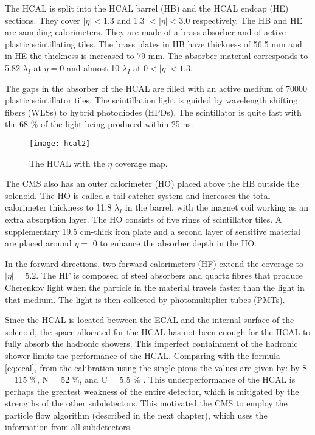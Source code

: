 \begin{normalsize}
The HCAL is split into the HCAL barrel (HB) and the HCAL endcap (HE) sections. They cover $ |\eta| < $1.3 and 1.3 $< |\eta| < $3.0 respectively. The HB and HE are sampling calorimeters. They are made of a brass absorber and of active plastic scintillating tiles. The brass plates in HB have thickness of 56.5 mm and in HE the thickness is increased to 79 mm. The absorber material corresponds to 5.82 $\lambda_I$ at $\eta = 0$ and almost 10 $\lambda_I$ at $0 < |\eta| < 1.3$.

The gaps in the absorber of the HCAL are filled with an active medium of 70000 plastic scintillator tiles. The scintillation light is guided by wavelength shifting fibers (WLSs) to hybrid photodiodes (HPDs). The scintillator is quite fast with the 68 $\%$ of the light being produced within 25 ns.

\begin{figure}[H]
  \centering
  \texttt{[image: hcal2]}
  \caption[The HCAL]{The HCAL with the $\eta$ coverage map.}
  \label{hcal2}
\end{figure}


The CMS also has an outer calorimeter (HO) placed above the HB outside the solenoid. The HO is called a tail catcher system and increases the total calorimeter thickness to 11.8 $\lambda_I$ in the barrel, with the magnet coil working as an extra absorption layer. The HO consists of five rings of scintillator tiles. A supplementary 19.5 cm-thick iron plate and a second layer of sensitive material are placed around $\eta =$ 0 to enhance the absorber depth in the HO. 

In the forward directions, two forward calorimeters (HF) extend the coverage to  $|\eta| = 5.2$. The HF is composed of steel absorbers and quartz fibres that produce Cherenkov light when the particle in the material travels faster than the light in that medium. The light is then collected by photomultiplier tubes (PMTs). 


Since the HCAL is located between the ECAL and the internal surface of the solenoid, the space allocated for the HCAL has not been enough for the HCAL to fully absorb the hadronic showers. This imperfect containment of the hadronic shower limits the performance of the HCAL. Comparing with the formula \ref{eq:ecal}, from the calibration using the single pions the values are given by:  by S = 115 $\%$, N = 52  $\%$, and C = 5.5 $\%$ \cite{Baiatian_hcal}. This underperformance of the HCAL is perhaps the greatest weakness of the entire detector, which is mitigated by the strengths of the other subdetectors. This motivated the CMS to employ the particle flow algorithm (described in the next chapter), which uses the information from all subdetectors.



\end{normalsize}
